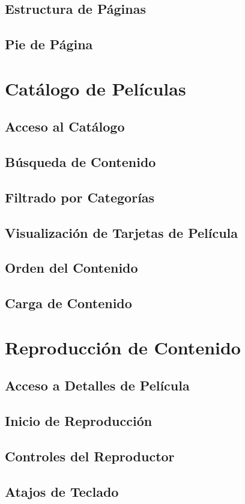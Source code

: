 \documentclass[11pt,a4paper,twoside]{book}
\begin{document}
\section{Estructura de Páginas}
\section{Pie de Página}

\chapter{Catálogo de Películas}
\section{Acceso al Catálogo}
\section{Búsqueda de Contenido}
\section{Filtrado por Categorías}
\section{Visualización de Tarjetas de Película}
\section{Orden del Contenido}
\section{Carga de Contenido}

\chapter{Reproducción de Contenido}
\section{Acceso a Detalles de Película}
\section{Inicio de Reproducción}
\section{Controles del Reproductor}
\section{Atajos de Teclado}
\end{document}
